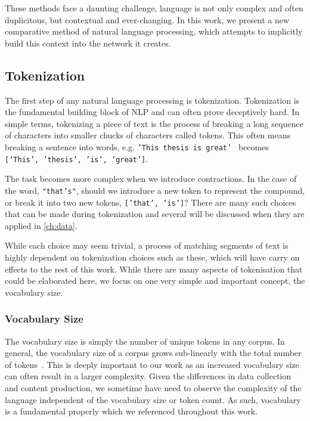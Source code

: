 These methods face a daunting challenge, language is not only complex and often duplicitous, but contextual and ever-changing. In this work, we present a new comparative method of natural language processing, which attempts to implicitly build this context into the network it creates.

\subsection{Tokenization}\label{sec:tokenization}
The first step of any natural language processing is tokenization. Tokenization is the fundamental building block of NLP and can often prove deceptively hard. In simple terms, tokenizing a piece of text is the process of breaking a long sequence of characters into smaller chucks of characters called tokens. This often means breaking a sentence into words, e.g. \texttt{'This thesis is great' } becomes \texttt{['This', 'thesis', 'is',  'great']}.

The task becomes more complex when we introduce contractions. In the case of the word, \texttt{"that's"}, should we introduce a new token to represent the compound, or break it into two new tokens, \texttt{['that', 'is']}? There are many such choices that can be made during tokenization and several will be discussed when they are applied in \autoref{ch:data}.

While each choice may seem trivial, a process of matching segments of text is highly dependent on tokenization choices such as these, which will have carry on effects to the rest of this work. While there are many aspects of tokenisation that could be elaborated here, we focus on one very simple and important concept, the vocabulary size. 


\subsubsection{Vocabulary Size}\label{sec:background_vocab_sizes}


The vocabulary size is simply the number of unique tokens in any corpus. In general, the vocabulary size of a corpus grows sub-linearly with the total number of tokens~\cite{heaps1978information}. This is deeply important to our work as an increased vocabulary size can often result in a larger complexity. Given the differences in data collection and content production, we sometime have need to observe the complexity of the language independent of the vocabulary size or token count. As such, vocabulary is a fundamental properly which we referenced throughout this work.

